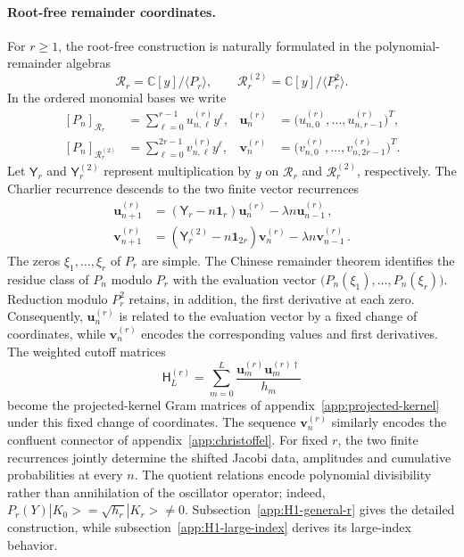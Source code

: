 \documentclass[a4paper,11pt]{article}
\def\ket#1{|#1>}%
\theoremstyle{definition}
\theoremstyle{remark}
\newcommand{\ket}[1]{|#1\rangle}
\newcommand{\CC}{\mathbb C}
\newcommand{\Id}{\mathbf 1}
\begin{document}
\paragraph{Root-free remainder coordinates.}
For $r\ge1$, the root-free construction is naturally formulated in the polynomial-remainder algebras
\begin{equation}
   \mathscr R_r=\CC[y]/\langle P_r\rangle,
   \qquad
   \mathscr R_r^{(2)}=\CC[y]/\langle P_r^2\rangle.
   \label{eq:H1-seed-residue-algebras-main}
\end{equation}
In the ordered monomial bases we write
\begin{equation}
\begin{aligned}
   [P_n]_{\mathscr R_r}
   &=\sum_{\ell=0}^{r-1}u_{n,\ell}^{(r)}y^\ell,
   &
   \mathbf u_n^{(r)}
   &=\bigl(u_{n,0}^{(r)},\ldots,u_{n,r-1}^{(r)}\bigr)^T,\\
   [P_n]_{\mathscr R_r^{(2)}}
   &=\sum_{\ell=0}^{2r-1}v_{n,\ell}^{(r)}y^\ell,
   &
   \mathbf v_n^{(r)}
   &=\bigl(v_{n,0}^{(r)},\ldots,v_{n,2r-1}^{(r)}\bigr)^T.
\end{aligned}
   \label{eq:H1-remainder-sequence-main}
\end{equation}
Let $\mathsf Y_r$ and $\mathsf Y_r^{(2)}$ represent multiplication by $y$ on $\mathscr R_r$ and $\mathscr R_r^{(2)}$, respectively. The Charlier recurrence descends to the two finite vector recurrences
\begin{equation}
\begin{aligned}
   \mathbf u_{n+1}^{(r)}
   &=(\mathsf Y_r-n\Id_r)\mathbf u_n^{(r)}
   -\lambda n\mathbf u_{n-1}^{(r)}\,,\\
   \mathbf v_{n+1}^{(r)}
   &=(\mathsf Y_r^{(2)}-n\Id_{2r})\mathbf v_n^{(r)}
   -\lambda n\mathbf v_{n-1}^{(r)}\,.
\end{aligned}
   \label{eq:H1-remainder-recurrence-main}
\end{equation}
The zeros $\xi_1,\ldots,\xi_r$ of $P_r$ are simple. The Chinese remainder theorem identifies the residue class of $P_n$ modulo $P_r$ with the evaluation vector
$
   \bigl(P_n(\xi_1),\ldots,P_n(\xi_r)\bigr).
$
Reduction modulo $P_r^2$ retains, in addition, the first derivative at each zero. Consequently, $\mathbf u_n^{(r)}$ is related to the evaluation vector by a fixed change of coordinates, while $\mathbf v_n^{(r)}$ encodes the corresponding values and first derivatives. The weighted cutoff matrices
\begin{equation}
   \mathsf H_L^{(r)}
   =\sum_{m=0}^{L}
   \frac{\mathbf u_m^{(r)}\mathbf u_m^{(r)\dagger}}{h_m}
\end{equation}
become the projected-kernel Gram matrices of appendix~\ref{app:projected-kernel} under this fixed change of coordinates. The sequence $\mathbf v_n^{(r)}$ similarly encodes the confluent connector of appendix~\ref{app:christoffel}. For fixed $r$, the two finite recurrences jointly determine the shifted Jacobi data, amplitudes and cumulative probabilities at every $n$. The quotient relations encode polynomial divisibility rather than annihilation of the oscillator operator; indeed, $P_r(Y)\ket{K_0}=\sqrt{h_r}\ket{K_r}\ne0$. Subsection~\ref{app:H1-general-r} gives the detailed construction, while subsection~\ref{app:H1-large-index} derives its large-index behavior.
\end{document}
